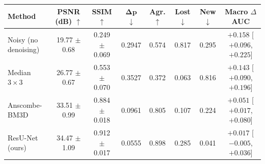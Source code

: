 \begin{tabular}{@{}lccccccc@{}}
\toprule
\textbf{Method} & \textbf{PSNR (dB)} $\uparrow$ & \textbf{SSIM} $\uparrow$ & $\boldsymbol{\Delta p}$ $\downarrow$ & \textbf{Agr.} $\uparrow$ & \textbf{Lost} $\downarrow$ & \textbf{New} $\downarrow$ & \textbf{Macro $\Delta$AUC} \\
\midrule
Noisy (no denoising) & 19.77 $\pm$ 0.68 & 0.249 $\pm$ 0.069 & 0.2947 & 0.574 & 0.817 & 0.295 & $+0.158$ [$+0.096$, $+0.225$] \\
Median $3\times3$ & 26.77 $\pm$ 0.67 & 0.553 $\pm$ 0.070 & 0.3527 & 0.372 & 0.063 & 0.816 & $+0.143$ [$+0.090$, $+0.196$] \\
Anscombe-BM3D & 33.51 $\pm$ 0.99 & 0.884 $\pm$ 0.018 & 0.0961 & 0.805 & 0.107 & 0.224 & $+0.051$ [$+0.017$, $+0.080$] \\
ResU-Net (ours) & 34.47 $\pm$ 1.09 & 0.912 $\pm$ 0.017 & 0.0555 & 0.898 & 0.285 & 0.041 & $+0.017$ [$-0.005$, $+0.036$] \\
\bottomrule
\end{tabular}
